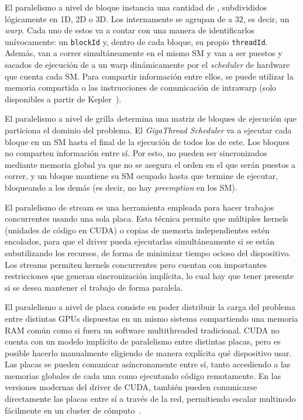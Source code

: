 El paralelismo a nivel de bloque instancia una cantidad de \threads{}, subdivididos l\'ogicamente en 1D, 2D o 3D.
Los \threads{} internamente se agrupan de a $32$, es decir, un \textit{warp}.
Cada uno de estos \threads{} va a contar con una manera de identificarlos un\'ivocamente: un \texttt{blockId} y, dentro de cada bloque, su propio \texttt{threadId}.
Adem\'as, van a correr simult\'aneamente en el mismo SM y van a ser puestos y sacados de ejecuci\'on de a un warp din\'amicamente por el \textit{scheduler} de hardware que cuenta cada SM.
Para compartir informaci\'on entre ellos, se puede utilizar la memoria compartida o las instrucciones de comunicaci\'on de \threads{} intrawarp (solo disponibles a partir de Kepler~\cite{NvidiaKepler}).

El paralelismo a nivel de grilla determina una matriz de bloques de ejecuci\'on que particiona el dominio del problema.
El \emph{GigaThread Scheduler} va a ejecutar cada bloque en un SM hasta el final de la ejecuci\'on de todos los \threads{} de este.
Los bloques no comparten informaci\'on entre s\'i. Por esto, no pueden ser sincronizados mediante memoria global ya que no se asegura el orden en el que ser\'an puestos a correr, y un bloque mantiene su SM ocupado hasta que termine de ejecutar, bloqueando a los dem\'as (es decir, no hay \textit{preemption} en los SM).

El paralelismo de stream es una herramienta empleada para hacer trabajos concurrentes usando una sola placa.
Esta t\'ecnica permite que m\'ultiples kernels (unidades de c\'odigo en CUDA) o copias de memoria independientes est\'en encolados, para que el driver pueda ejecutarlas simult\'aneamente si se est\'an subutilizando los recursos, de forma de minimizar tiempo ocioso del dispositivo.
Los streams permiten kernels concurrentes pero cuentan con importantes restricciones que generan sincronizaci\'on impl\'icita, lo cual hay que tener presente si se desea mantener el trabajo de forma paralela.

El paralelismo a nivel de placa consiste en poder distribuir la carga del problema entre distintas GPUs dispuestas en un mismo sistema compartiendo una memoria RAM com\'un como si fuera un software multithreaded tradicional.
CUDA no cuenta con un modelo impl\'icito de paralelismo entre distintas placas, pero es posible hacerlo manualmente eligiendo de manera expl\'icita qu\'e dispositivo usar.
Las placas se pueden comunicar as\'incronamente entre s\'i, tanto accediendo a las memorias globales de cada una como ejecutando c\'odigo remotamente.
En las versiones modernas del driver de CUDA, tambi\'en pueden comunicarse directamente las placas entre s\'i a trav\'es de la red, permitiendo escalar multinodo f\'acilmente en un cluster de c\'omputo~\cite{farberCuda}.

